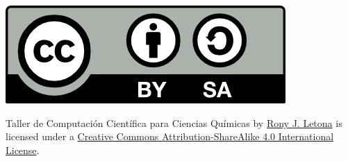\documentclass[10pt,letterpaper]{article}
\begin{document}
\noindent \includegraphics{img/cc_big.png}

\noindent Taller de Computaci\'on Cient\'ifica para Ciencias Qu\'imicas by \href{http://github.com/zronyj/TC3Q}{Rony J. Letona} is licensed under a \href{http://creativecommons.org/licenses/by-sa/4.0/}{Creative Commons Attribution-ShareAlike 4.0 International License}.
\end{document}
